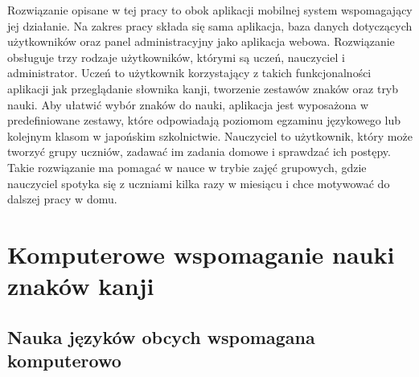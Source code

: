 \documentclass[a4paper,twoside,12pt]{book}
\newcommand{\obcy}[1]{\emph{#1}}
\newcommand{\english}[1]{{\selectlanguage{british}\obcy{#1}}}
\begin{document}
Rozwiązanie opisane w tej pracy to obok aplikacji mobilnej system wspomagający jej działanie. Na zakres pracy składa się sama aplikacja, baza danych dotyczących użytkowników oraz panel administracyjny jako aplikacja webowa. Rozwiązanie obsługuje trzy rodzaje użytkowników, którymi są uczeń, nauczyciel i administrator. Uczeń to użytkownik korzystający z takich funkcjonalności aplikacji jak przeglądanie słownika kanji, tworzenie zestawów znaków oraz tryb nauki. Aby ułatwić wybór znaków do nauki, aplikacja jest wyposażona w predefiniowane zestawy, które odpowiadają poziomom egzaminu językowego lub kolejnym klasom w japońskim szkolnictwie. Nauczyciel to użytkownik, który może tworzyć grupy uczniów, zadawać im zadania domowe i sprawdzać ich postępy. Takie rozwiązanie ma pomagać w nauce w trybie zajęć grupowych, gdzie nauczyciel spotyka się z uczniami kilka razy w miesiącu i chce motywować do dalszej pracy w domu. 

\chapter{Komputerowe wspomaganie nauki znaków kanji}

\section{Nauka języków obcych wspomagana komputerowo}


\end{document}
